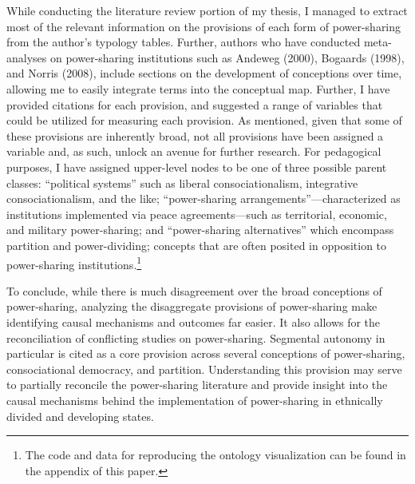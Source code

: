 \documentclass[12pt]{article}
\begin{document}
While conducting the literature review portion of my thesis, I managed to extract most of the relevant information on the provisions of each form of power-sharing from the author’s typology tables. Further, authors who have conducted meta-analyses on power-sharing institutions such as Andeweg (2000), Bogaards (1998), and Norris (2008), include sections on the development of conceptions over time, allowing me to easily integrate terms into the conceptual map. Further, I have provided citations for each provision, and suggested a range of variables that could be utilized for measuring each provision. As mentioned, given that some of these provisions are inherently broad, not all provisions have been assigned a variable and, as such, unlock an avenue for further research. For pedagogical purposes, I have assigned upper-level nodes to be one of three possible parent classes: ``political systems'' such as liberal consociationalism, integrative consociationalism, and the like; ``power-sharing arrangements''---characterized as institutions implemented via peace agreements---such as territorial, economic, and military power-sharing; and ``power-sharing alternatives'' which encompass partition and power-dividing; concepts that are often posited in opposition to power-sharing institutions.\footnote{The code and data for reproducing the ontology visualization can be found in the appendix of this paper.}

To conclude, while there is much disagreement over the broad conceptions of power-sharing, analyzing the disaggregate provisions of power-sharing make identifying causal mechanisms and outcomes far easier. It also allows for the reconciliation of conflicting studies on power-sharing. Segmental autonomy in particular is cited as a core provision across several conceptions of power-sharing, consociational democracy, and partition. Understanding this provision may serve to partially reconcile the power-sharing literature and provide insight into the causal mechanisms behind the implementation of power-sharing in ethnically divided and developing states. 
\end{document}
